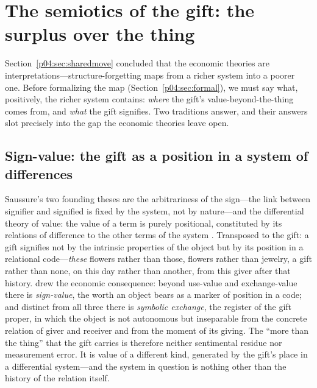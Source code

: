 \section{The semiotics of the gift: the surplus over the thing}
\label{p04:sec:semiotic}

Section~\ref{p04:sec:sharedmove} concluded that the economic theories are
interpretations---structure-forgetting maps from a richer system into a
poorer one. Before formalizing the map (Section~\ref{p04:sec:formal}), we must
say what, positively, the richer system contains: \emph{where} the gift's
value-beyond-the-thing comes from, and \emph{what} the gift signifies. Two
traditions answer, and their answers slot precisely into the gap the
economic theories leave open.

\subsection{Sign-value: the gift as a position in a system of differences}
\label{p04:sec:signvalue}
Saussure's two founding theses are the arbitrariness of the sign---the link
between signifier and signified is fixed by the system, not by nature---and
the differential theory of value: the value of a term is purely positional,
constituted by its relations of difference to the other terms of the system
\parencite{saussure1916}. Transposed to the gift: a gift signifies not by the
intrinsic properties of the object but by its position in a relational
code---\emph{these} flowers rather than those, flowers rather than jewelry, a
gift rather than none, on this day rather than another, from this giver
after that history. \textcite{baudrillard1981} drew the economic consequence:
beyond use-value and exchange-value there is \emph{sign-value}, the worth an
object bears as a marker of position in a code; and distinct from all three
there is \emph{symbolic exchange}, the register of the gift proper, in which
the object is not autonomous but inseparable from the concrete relation of
giver and receiver and from the moment of its giving. The ``more than the
thing'' that the gift carries is therefore neither sentimental residue nor
measurement error. It is value of a different kind, generated by the gift's
place in a differential system---and the system in question is nothing other
than the history of the relation itself.

